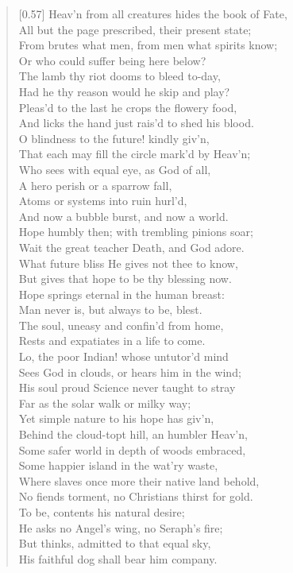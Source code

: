 \begin{verse}[0.57\textwidth]
Heav'n from all creatures hides the book of Fate,\\
All but the page prescribed, their present state;\\
From brutes what men, from men what spirits know;\\
Or who could suffer being here below?\\
The lamb thy riot dooms to bleed to-day,\\
Had he thy reason would he skip and play?\\
Pleas'd to the last he crops the flowery food,\\
And licks the hand just rais'd to shed his blood.\\
O blindness to the future! kindly giv'n,\\
That each may fill the circle mark'd by Heav'n;\\
Who sees with equal eye, as God of all,\\
A hero perish or a sparrow fall,\\
Atoms or systems into ruin hurl'd,\\
And now a bubble burst, and now a world.\\
\vin Hope humbly then; with trembling pinions soar;\\
Wait the great teacher Death, and God adore.\\
What future bliss He gives not thee to know,\\
But gives that hope to be thy blessing now.\\
Hope springs eternal in the human breast:\\
Man never is, but always to be, blest.\\
The soul, uneasy and confin'd from home,\\
Rests and expatiates in a life to come.\\
\vin Lo, the poor Indian! whose untutor'd mind\\
Sees God in clouds, or hears him in the wind;\\
His soul proud Science never taught to stray\\
Far as the solar walk or milky way;\\
Yet simple nature to his hope has giv'n,\\
Behind the cloud-topt hill, an humbler Heav'n,\\
Some safer world in depth of woods embraced,\\
Some happier island in the wat'ry waste,\\
Where slaves once more their native land behold,\\
No fiends torment, no Christians thirst for gold.\\
To be, contents his natural desire;\\
He asks no Angel's wing, no Seraph's fire;\\
But thinks, admitted to that equal sky,\\
His faithful dog shall bear him company.


\end{verse}
